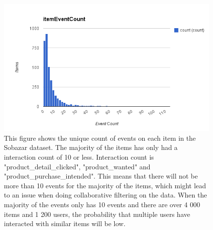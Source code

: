     \begin{figure}[H]
        \includegraphics[width=5in]{image/item-event-count.png}
        \centering
        \caption[Count of events on each unique item]{This figure shows the unique count of events on each item in the Sobazar dataset.
        The majority of the items has only had a interaction count of 10 or less.
        Interaction count is "product\_detail\_clicked", "product\_wanted" and "product\_purchase\_intended".
        This means that there will not be more than 10 events for the majority of the items, which might lead to an issue when doing collaborative filtering on the data.
        When the majority of the events only has 10 events and there are over 4 000 items and 1 200 users, the probability that multiple users have interacted with similar items will be low.}
    \end{figure}

